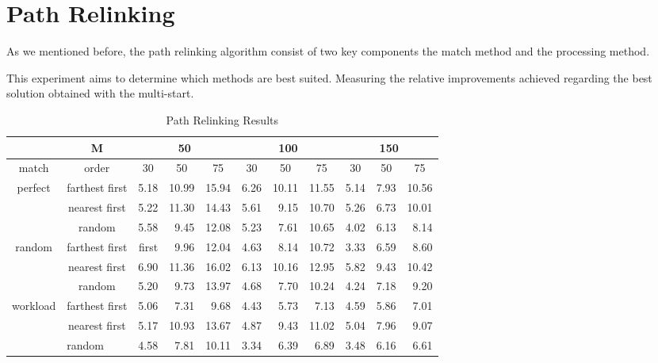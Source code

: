 \section{Path Relinking}
As we mentioned before,
the path relinking algorithm
consist of two key components
the match method and the processing method.

This experiment aims to determine which methods are best suited.
Measuring the relative improvements
achieved regarding the best solution
obtained with the multi-start.

\begin{table}[H]
  \centering
  \label{tab:pr}
  \begin{tabular}{c|c|rrr|rrr|rrr|}
    \cline{2-11}
    \multicolumn{1}{l|}{} & M
    & \multicolumn{3}{c|}{50} 
    & \multicolumn{3}{c|}{100}
    & \multicolumn{3}{c|}{150}
    \\ \hline
    \multicolumn{1}{|c|}{match} & order
    & \multicolumn{1}{c}{30} & \multicolumn{1}{c}{50} & \multicolumn{1}{c|}{75}
    & \multicolumn{1}{c}{30} & \multicolumn{1}{c}{50} & \multicolumn{1}{c|}{75}
    & \multicolumn{1}{c}{30} & \multicolumn{1}{c}{50} & \multicolumn{1}{c|}{75}
    \\ \hline
    \multicolumn{1}{|c|}{\multirow{3}{*}{perfect}}
    & farthest first
    & 5.18       & 10.99      & 15.94
    & 6.26       & 10.11      & 11.55
    & 5.14       & 7.93       & 10.56
    \\
    \multicolumn{1}{|c|}{}
    & nearest first
    & 5.22       & 11.30      & 14.43
    & 5.61       & 9.15       & 10.70
    & 5.26       & 6.73       & 10.01
    \\
    \multicolumn{1}{|c|}{}
    & random
    & 5.58       & 9.45       & 12.08
    & 5.23       & 7.61       & 10.65
    & 4.02       & 6.13       & 8.14
    \\ \hline
    \multicolumn{1}{|c|}{\multirow{3}{*}{random}}
    & farthest first
    & first      & 9.96       & 12.04
    & 4.63       & 8.14       & 10.72
    & 3.33       & 6.59       & 8.60
    \\
    \multicolumn{1}{|c|}{}
    & nearest first
    & 6.90       & 11.36      & 16.02
    & 6.13       & 10.16      & 12.95
    & 5.82       & 9.43       & 10.42
    \\
    \multicolumn{1}{|c|}{}
    & random
    & 5.20       & 9.73       & 13.97
    & 4.68       & 7.70       & 10.24
    & 4.24       & 7.18       & 9.20
    \\ \hline
    \multicolumn{1}{|c|}{\multirow{3}{*}{workload}}
    & farthest first
    & 5.06       & 7.31       & 9.68
    & 4.43       & 5.73       & 7.13
    & 4.59       & 5.86       & 7.01
    \\
    \multicolumn{1}{|c|}{}
    & nearest first
    & 5.17       & 10.93      & 13.67
    & 4.87       & 9.43       & 11.02
    & 5.04       & 7.96       & 9.07
    \\
    \multicolumn{1}{|c|}{}
    & \multicolumn{1}{l|}{random}
    & 4.58       & 7.81       & 10.11
    & 3.34       & 6.39       & 6.89
    & 3.48       & 6.16       & 6.61
    \\ \hline
  \end{tabular}
  \caption{Path Relinking Results}
\end{table}
